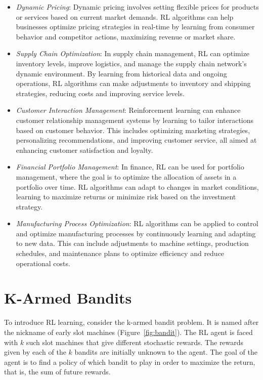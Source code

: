 \begin{itemize}
\item \emph{Dynamic Pricing}: Dynamic pricing involves setting flexible prices for products or services based on current market demands. RL algorithms can help businesses optimize pricing strategies in real-time by learning from consumer behavior and competitor actions, maximizing revenue or market share.

\item \emph{Supply Chain Optimization}: In supply chain management, RL can optimize inventory levels, improve logistics, and manage the supply chain network's dynamic environment. By learning from historical data and ongoing operations, RL algorithms can make adjustments to inventory and shipping strategies, reducing costs and improving service levels.

\item \emph{Customer Interaction Management}: Reinforcement learning can enhance customer relationship management systems by learning to tailor interactions based on customer behavior. This includes optimizing marketing strategies, personalizing recommendations, and improving customer service, all aimed at enhancing customer satisfaction and loyalty.

\item \emph{Financial Portfolio Management}: In finance, RL can be used for portfolio management, where the goal is to optimize the allocation of assets in a portfolio over time. RL algorithms can adapt to changes in market conditions, learning to maximize returns or minimize risk based on the investment strategy.

\item \emph{Manufacturing Process Optimization}: RL algorithms can be applied to control and optimize manufacturing processes by continuously learning and adapting to new data. This can include adjustments to machine settings, production schedules, and maintenance plans to optimize efficiency and reduce operational costs.
\end{itemize}

\section{K-Armed Bandits}

To introduce RL learning, consider the k-armed bandit problem. It is named after the nickname of early slot machines (Figure~\ref{fig:bandit}). The RL agent is faced with $k$ such slot machines that give different stochastic rewards. The rewards given by each of the $k$ bandits are initially unknown to the agent. The goal of the agent is to find a policy of which bandit to play in order to maximize the return, that is, the sum of future rewards.

